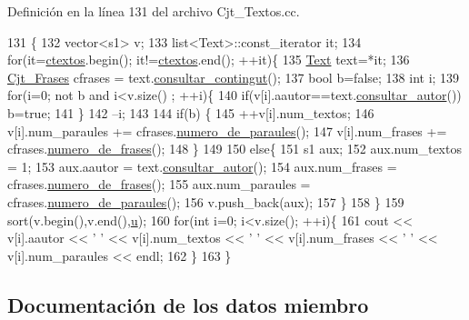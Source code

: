 Definición en la línea 131 del archivo Cjt\+\_\+\+Textos.\+cc.


\begin{DoxyCode}
131                                            \{
132   vector<s1> v;
133   list<Text>::const\_iterator it;
134   \textcolor{keywordflow}{for}(it=\hyperlink{class_cjt___textos_a73503568d56e3a77949f720684916492}{ctextos}.begin(); it!=\hyperlink{class_cjt___textos_a73503568d56e3a77949f720684916492}{ctextos}.end(); ++it)\{
135     \hyperlink{class_text}{Text} text=*it;
136     \hyperlink{class_cjt___frases}{Cjt\_Frases} cfrases = text.\hyperlink{class_text_ae21dfb276d73f5a5b0994650335591c9}{consultar\_contingut}();
137     \textcolor{keywordtype}{bool} b=\textcolor{keyword}{false};
138     \textcolor{keywordtype}{int} i;
139     \textcolor{keywordflow}{for}(i=0; not b and i<v.size() ; ++i)\{
140       \textcolor{keywordflow}{if}(v[i].aautor==text.\hyperlink{class_text_a0e8d29f53728da7b65ff1e87588ec407}{consultar\_autor}()) b=\textcolor{keyword}{true};
141       \}
142     --i;
143     
144     \textcolor{keywordflow}{if}(b) \{
145       ++v[i].num\_textos;
146       v[i].num\_paraules += cfrases.\hyperlink{class_cjt___frases_a42ba9f0a302235d52ca4063dd9ef2145}{numero\_de\_paraules}();
147       v[i].num\_frases += cfrases.\hyperlink{class_cjt___frases_aaf9ad179f28ad0b4e782510c345e0cca}{numero\_de\_frases}();
148       \}
149 
150     \textcolor{keywordflow}{else}\{
151       s1 aux;
152       aux.num\_textos = 1;
153       aux.aautor = text.\hyperlink{class_text_a0e8d29f53728da7b65ff1e87588ec407}{consultar\_autor}();
154       aux.num\_frases = cfrases.\hyperlink{class_cjt___frases_aaf9ad179f28ad0b4e782510c345e0cca}{numero\_de\_frases}();
155       aux.num\_paraules = cfrases.\hyperlink{class_cjt___frases_a42ba9f0a302235d52ca4063dd9ef2145}{numero\_de\_paraules}();
156       v.push\_back(aux);
157       \}
158   \}
159   sort(v.begin(),v.end(),\hyperlink{class_cjt___textos_a586115f5b8f182038544ccc67dfc09bc}{u});
160   \textcolor{keywordflow}{for}(\textcolor{keywordtype}{int} i=0; i<v.size(); ++i)\{
161     cout << v[i].aautor << \textcolor{charliteral}{' '} << v[i].num\_textos << \textcolor{charliteral}{' '} << v[i].num\_frases << \textcolor{charliteral}{' '} << v[i].num\_paraules << 
      endl;
162     \}
163 \}
\end{DoxyCode}


\subsection{Documentación de los datos miembro}
